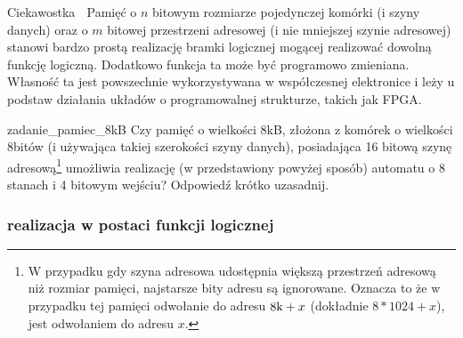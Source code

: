\documentclass{pdfBooklets}
\begin{document}
\begin{center}\end{center}

\begin{ProTip}{Ciekawostka {\Symbola 🤔}}
Pamięć o $n$ bitowym rozmiarze pojedynczej komórki (i szyny danych) oraz o $m$ bitowej przestrzeni adresowej (i nie mniejszej szynie adresowej) stanowi bardzo prostą realizację bramki logicznej mogącej realizować dowolną funkcję logiczną. Dodatkowo funkcja ta może być programowo zmieniana. Własność ta jest powszechnie wykorzystywana w współczesnej elektronice i leży u podstaw działania układów o programowalnej strukturze, takich jak FPGA.
\end{ProTip}

\begin{Zadanie}{}{zadanie_pamiec_8kB}
Czy pamięć o wielkości 8kB, złożona z komórek o wielkości 8bitów (i używająca takiej szerokości szyny danych), posiadająca 16 bitową szynę adresową\footnote{
	W przypadku gdy szyna adresowa udostępnia większą przestrzeń adresową niż rozmiar pamięci, najstarsze bity adresu są ignorowane.
	Oznacza to że w przypadku tej pamięci odwołanie do adresu $8{\rm k} + x$ (dokładnie $8*1024+x$), jest odwołaniem do adresu $x$.
} umożliwia realizację (w przedstawiony powyżej sposób) automatu o 8 stanach i 4 bitowym wejściu? Odpowiedź krótko uzasadnij.
\end{Zadanie}

\subsubsection{realizacja w postaci funkcji logicznej}
\end{document}
